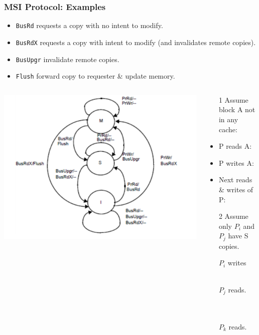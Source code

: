 \documentclass{beamer}
\renewcommand{\emph}[1]{\textcolor{structure}{#1}}
\begin{document}
\begin{frame}[fragile,t]
\frametitle{MSI Protocol: Examples}

\begin{itemize}
    \item \emph{\tt BusRd} requests a copy with no intent to modify.
    \item \emph{\tt BusRdX} requests a copy with intent to modify (and invalidates remote copies).
    \item \emph{\tt BusUpgr} invalidate remote copies.  
    \item \emph{\tt Flush} forward copy to requester \& update memory.
\end{itemize} 


\begin{columns}\hspace{-7ex}
\includegraphics[width=40ex]{Figures/FigsInfCoherence/MSI}
\begin{scriptsize}
\begin{itemize}
    \item[1] \emph{Assume block A not in any cache:}
    \item P reads A: 
    \item P writes A:  
    \item Next reads \& writes of P:\medskip

    \item[2] \emph{Assume only $P_i$ and $P_j$ have S copies.}
    \item[$P_i$ writes] {\tt~~}\\
                        {\tt~~}
    \item[$P_j$ reads.] {\tt~~}\\
                        {\tt~~}\\
                        {\tt~~}
    \item[$P_k$ reads.] {\tt~~}\\
                        {\tt~~}\\ 
                        {\tt~~}\\
\end{itemize}
\end{scriptsize}
\end{columns}

\end{frame}
\end{document}

